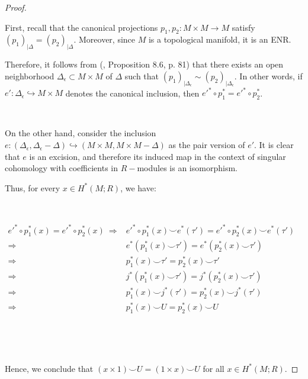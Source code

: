 \documentclass[12pt,oneside]{book}
\newcommand{\ccup}{\smile}
\begin{document}
    \begin{proof}

        \

        First, recall that the canonical projections $p_{1}, p_{2}: M\times M \to M$ satisfy $(p_{1})_{|\Delta} = (p_{2})_{|\Delta}$. Moreover, 
        since $M$ is a topological manifold, it is an ENR.
        
        Therefore, it follows from (\cite{dold}, Proposition 8.6, p. 81) that there exists an open neighborhood 
        $\Delta_{\epsilon} \subset M\times M$ of $\Delta$ such that $(p_{1})_{|\Delta_{\epsilon}} \sim (p_{2})_{|\Delta_{\epsilon}}$. 
        In other words, if $e': \Delta_{\epsilon} \hookrightarrow M\times M$ denotes the canonical inclusion, then 
        $e'^{*} \circ p_{1}^{*} = e'^{*} \circ p_{2}^{*}$.

        \
        
        On the other hand, consider the inclusion 
        $e: (\Delta_{\epsilon}, \Delta_{\epsilon} - \Delta) \hookrightarrow (M\times M, M\times M - \Delta)$ as the pair version of $e'$. It 
        is clear that $e$ is an excision, and therefore its induced map in the context of singular cohomology with 
        coefficients in $R-$modules is an isomorphism.
        
        Thus, for every $x \in H^{*}(M;R)$, we have:

        \

        $\begin{array}{rl}
        	e'^{*} \circ p_{1}^{*}(x) = e'^{*} \circ p_{2}^{*}(x) \ \Longrightarrow & e'^{*} \circ p_{1}^{*}(x) \ccup e^{*}(\tau') = e'^{*} \circ p_{2}^{*}(x) \ccup e^{*}(\tau') \\
        	\Longrightarrow & e^{*}(p_{1}^{*}(x) \ccup \tau') = e^{*}(p_{2}^{*}(x) \ccup \tau') \\
        	\Longrightarrow & p_{1}^{*}(x) \ccup \tau' = p_{2}^{*}(x) \ccup \tau' \\
        	\Longrightarrow & j^{*}(p_{1}^{*}(x) \ccup \tau') = j^{*}(p_{2}^{*}(x) \ccup \tau') \\
        	\Longrightarrow & p_{1}^{*}(x) \ccup j^{*}(\tau') = p_{2}^{*}(x) \ccup j^{*}(\tau') \\
        	\Longrightarrow & p_{1}^{*}(x) \ccup U = p_{2}^{*}(x) \ccup U
        \end{array}$
        
        \

        \

        Hence, we conclude that $(x \times 1) \ccup U = (1 \times x) \ccup U$ for all $x \in H^{*}(M;R)$.

    \end{proof}
\end{document}
